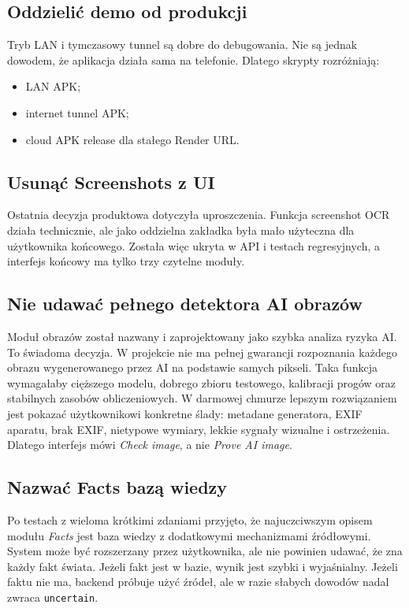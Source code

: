 \documentclass[12pt,a4paper]{article}
\begin{document}
\subsection{Oddzielić demo od produkcji}
Tryb LAN i tymczasowy tunnel są dobre do debugowania.
Nie są jednak dowodem, że aplikacja działa sama na telefonie.
Dlatego skrypty rozróżniają:
\begin{itemize}
  \item LAN APK;
  \item internet tunnel APK;
  \item cloud APK release dla stałego Render URL.
\end{itemize}

\subsection{Usunąć Screenshots z UI}
Ostatnia decyzja produktowa dotyczyła uproszczenia.
Funkcja screenshot OCR działa technicznie, ale jako oddzielna zakładka była mało użyteczna dla użytkownika końcowego.
Została więc ukryta w API i testach regresyjnych, a interfejs końcowy ma tylko trzy czytelne moduły.

\subsection{Nie udawać pełnego detektora AI obrazów}
Moduł obrazów został nazwany i zaprojektowany jako szybka analiza ryzyka AI.
To świadoma decyzja.
W projekcie nie ma pełnej gwarancji rozpoznania każdego obrazu wygenerowanego przez AI na podstawie samych pikseli.
Taka funkcja wymagałaby cięższego modelu, dobrego zbioru testowego, kalibracji progów oraz stabilnych zasobów obliczeniowych.
W darmowej chmurze lepszym rozwiązaniem jest pokazać użytkownikowi konkretne ślady: metadane generatora, EXIF aparatu, brak EXIF, nietypowe wymiary, lekkie sygnały wizualne i ostrzeżenia.
Dlatego interfejs mówi \textit{Check image}, a nie \textit{Prove AI image}.

\subsection{Nazwać Facts bazą wiedzy}
Po testach z wieloma krótkimi zdaniami przyjęto, że najuczciwszym opisem modułu \textit{Facts} jest baza wiedzy z dodatkowymi mechanizmami źródłowymi.
System może być rozszerzany przez użytkownika, ale nie powinien udawać, że zna każdy fakt świata.
Jeżeli fakt jest w bazie, wynik jest szybki i wyjaśnialny.
Jeżeli faktu nie ma, backend próbuje użyć źródeł, ale w razie słabych dowodów nadal zwraca \texttt{uncertain}.
\end{document}
